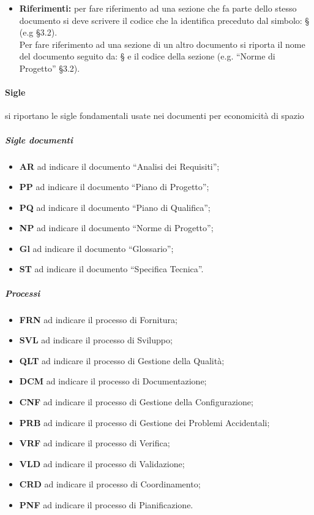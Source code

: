 \begin{itemize}
\begin{itemize}
							\item\textbf{Riferimenti:} per fare riferimento ad una sezione che fa parte dello stesso documento si deve scrivere il codice che la identifica preceduto dal simbolo: § (e.g §3.2). \\
								Per fare riferimento ad una sezione di un altro documento si riporta il nome del documento seguito da: § e il codice della sezione (e.g. “Norme di Progetto” §3.2).\\
						\end{itemize}
				\end{itemize}
			\paragraph{Sigle}
				si riportano le sigle fondamentali usate nei documenti per economicità di spazio
				\subparagraph{Sigle documenti}
					\begin{itemize}
						\item\textbf{AR} ad indicare il documento “Analisi dei Requisiti”;
						\item\textbf{PP} ad indicare il documento “Piano di Progetto”;
						\item\textbf{PQ} ad indicare il documento “Piano di Qualifica”;
						\item\textbf{NP} ad indicare il documento “Norme di Progetto”;
						\item\textbf{Gl} ad indicare il documento “Glossario”;
						\item\textbf{ST} ad indicare il documento “Specifica Tecnica”.
					\end{itemize}
				\subparagraph{Processi}
					\begin{itemize}
						\item\textbf{FRN} ad indicare il processo di Fornitura;
						\item\textbf{SVL} ad indicare il processo di Sviluppo;
						\item\textbf{QLT} ad indicare il processo di Gestione della Qualità;
						\item\textbf{DCM} ad indicare il processo di Documentazione;
						\item\textbf{CNF} ad indicare il processo di Gestione della Configurazione;
						\item\textbf{PRB} ad indicare il processo di Gestione dei Problemi Accidentali;
						\item\textbf{VRF} ad indicare il processo di Verifica;
						\item\textbf{VLD} ad indicare il processo di Validazione;
						\item\textbf{CRD} ad indicare il processo di Coordinamento;
						\item\textbf{PNF} ad indicare il processo di Pianificazione.
					\end{itemize}
